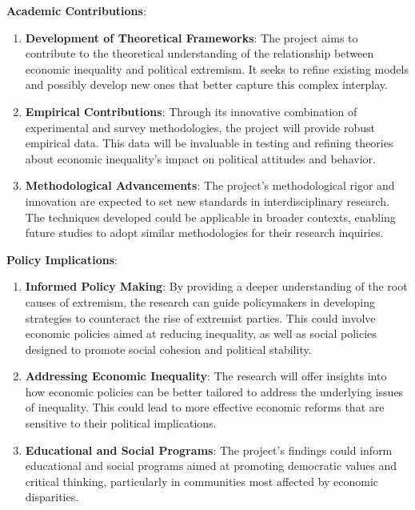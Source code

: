 \documentclass[letterpaper]{article}
\renewenvironment{itemize}{
  \begin{list}{}{
    \setlength{\leftmargin}{1.5em}
  }
}{
  \end{list}
}
\begin{document}
\begin{itemize}

  \item {\bf Academic Contributions}: 
    \begin{enumerate}
      \item {\bf Development of Theoretical Frameworks}: The project aims to contribute to the theoretical understanding of the relationship between economic inequality and political extremism. It seeks to refine existing models and possibly develop new ones that better capture this complex interplay.

      \item {\bf Empirical Contributions}: Through its innovative combination of experimental and survey methodologies, the project will provide robust empirical data. This data will be invaluable in testing and refining theories about economic inequality's impact on political attitudes and behavior.

      \item {\bf Methodological Advancements}: The project's methodological rigor and innovation are expected to set new standards in interdisciplinary research. The techniques developed could be applicable in broader contexts, enabling future studies to adopt similar methodologies for their research inquiries.
    \end{enumerate}

  \item {\bf Policy Implications}: 
    \begin{enumerate}
      \item {\bf Informed Policy Making}: By providing a deeper understanding of the root causes of extremism, the research can guide policymakers in developing strategies to counteract the rise of extremist parties. This could involve economic policies aimed at reducing inequality, as well as social policies designed to promote social cohesion and political stability.

      \item {\bf Addressing Economic Inequality}: The research will offer insights into how economic policies can be better tailored to address the underlying issues of inequality. This could lead to more effective economic reforms that are sensitive to their political implications.

      \item {\bf Educational and Social Programs}: The project's findings could inform educational and social programs aimed at promoting democratic values and critical thinking, particularly in communities most affected by economic disparities.
    \end{enumerate}


\end{itemize}
\end{document}
